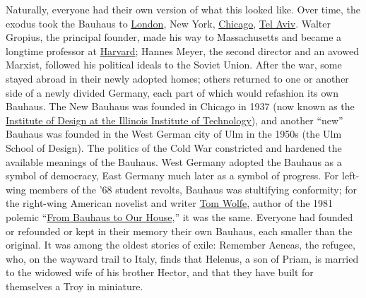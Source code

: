 Naturally, everyone had their own version of what this looked like. Over
time, the exodus took the Bauhaus to
\href{https://www.nytimes3xbfgragh.onion/2019/01/16/travel/five-places-to-visit-in-london.html}{London},
New York,
\href{https://www.nytimes3xbfgragh.onion/2018/10/18/travel/what-to-do-in-chicago.html}{Chicago},
\href{https://www.nytimes3xbfgragh.onion/interactive/2015/12/30/travel/what-to-do-in-36-hours-in-tel-aviv.html}{Tel
Aviv}. Walter Gropius, the principal founder, made his way to
Massachusetts and became a longtime professor at
\href{https://www.nytimes3xbfgragh.onion/topic/organization/harvard-university}{Harvard};
Hannes Meyer, the second director and an avowed Marxist, followed his
political ideals to the Soviet Union. After the war, some stayed abroad
in their newly adopted homes; others returned to one or another side of
a newly divided Germany, each part of which would refashion its own
Bauhaus. The New Bauhaus was founded in Chicago in 1937 (now known as
the \href{https://id.iit.edu/the-new-bauhaus/}{Institute of Design at
the Illinois Institute of Technology}), and another ``new'' Bauhaus was
founded in the West German city of Ulm in the 1950s (the Ulm School of
Design). The politics of the Cold War constricted and hardened the
available meanings of the Bauhaus. West Germany adopted the Bauhaus as a
symbol of democracy, East Germany much later as a symbol of progress.
For left-wing members of the '68 student revolts, Bauhaus was
stultifying conformity; for the right-wing American novelist and writer
\href{https://www.nytimes3xbfgragh.onion/2018/05/15/obituaries/tom-wolfe-pyrotechnic-nonfiction-writer-and-novelist-dies-at-88.html}{Tom
Wolfe}, author of the 1981 polemic
``\href{https://us.macmillan.com/books/9780312429140}{From Bauhaus to
Our House},'' it was the same. Everyone had founded or refounded or kept
in their memory their own Bauhaus, each smaller than the original. It
was among the oldest stories of exile: Remember Aeneas, the refugee,
who, on the wayward trail to Italy, finds that Helenus, a son of Priam,
is married to the widowed wife of his brother Hector, and that they have
built for themselves a Troy in miniature.


